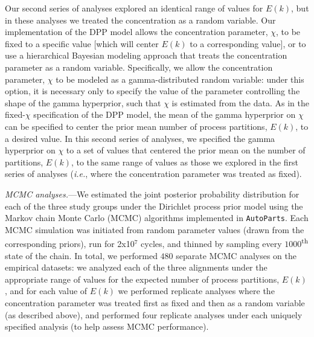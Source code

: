 \documentclass[11pt]{article}
\begin{document}
Our second series of analyses explored an identical range of values for $E(k)$, but in these analyses we treated the concentration as a random variable.
Our implementation of the DPP model allows the concentration parameter, $\chi$, to be fixed to a specific value [which will center $E(k)$ to a corresponding value], or to use a hierarchical Bayesian modeling approach that treats the concentration parameter as a random variable.
Specifically, we allow the concentration parameter, $\chi$ to be modeled as a gamma-distributed random variable: under this option, it is necessary only to specify the value of the parameter controlling the shape of the gamma hyperprior, such that $\chi$ is estimated from the data.
As in the fixed-$\chi$ specification of the DPP model, the mean of the gamma hyperprior on $\chi$ can be specified to center the prior mean number of process partitions, $E(k)$, to a desired value.
In this second series of analyses, we specified the gamma hyperprior on $\chi$ to a set of values that centered the prior mean on the number of partitions, $E(k)$, to the same range of values as those we explored in the first series of analyses ({\it i.e.}, where the concentration parameter was treated as fixed).

\bigskip
\noindent
{\it MCMC analyses.}---We estimated the joint posterior probability distribution for each of the three study groups under the Dirichlet process prior model using the Markov chain Monte Carlo (MCMC) algorithms implemented in \verb!AutoParts!.
Each MCMC simulation was initiated from random parameter values (drawn from the corresponding priors), run for 2x10$^7$ cycles, and thinned by sampling every $1000$\textsuperscript{th} state of the chain.
In total, we performed $480$ separate MCMC analyses on the empirical datasets: we analyzed each of the three alignments under the appropriate range of values for the expected number of process partitions, $E(k)$, and for each value of $E(k)$ we performed replicate analyses where the concentration parameter was treated first as fixed and then as a random variable (as described above), and performed four replicate analyses under each uniquely specified analysis (to help assess MCMC performance).  
\end{document}
